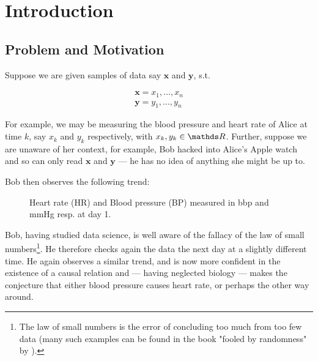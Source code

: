 
\chapter{Introduction}

\section{Problem and Motivation}

Suppose we are given samples of data say $\mathbf{x}$ and $\mathbf{y}$, s.t.

\begin{align*}
    \mathbf{x} = x_1, ..., x_n  \\
    \mathbf{y} = y_1, ..., y_n 
\end{align*}

For example, we may be measuring the blood pressure and heart rate of Alice at time $k$, 
say $x_k$ and $y_k$ respectively, with $x_k, y_k \in \R$. Further, suppose we are unaware of her context, for example,
Bob hacked into Alice's Apple watch and so can only read $\mathbf{x}$ and $\mathbf{y}$ --- he has no idea of 
anything she might be up to.

Bob then observes the following trend:

\begin{figure}[htb]
    \centering
    \caption{Heart rate (HR) and Blood pressure (BP) measured in bbp and mmHg resp. at day 1.}
\end{figure}

Bob, having studied data science, is well aware of the fallacy of the law of small numbers\footnote{
    The law of small numbers is the error of concluding too much from too few data (many such examples 
    can be found in the book "fooled by randomness" by \cite{taleb}).}. 
 He therefore checks again the data the next day at a slightly different time. He again observes 
a similar trend, and is now more confident in the existence of a causal relation and --- having neglected biology --- 
makes the conjecture that either blood pressure causes heart rate, or 
perhaps the other way around. 

